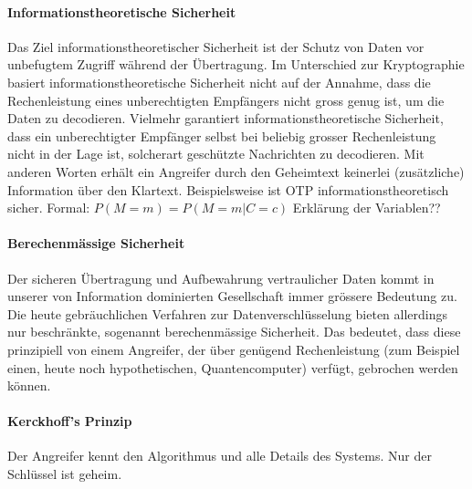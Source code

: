 \documentclass[10pt,a4paper]{article}
\begin{document}
\paragraph*{Informationstheoretische Sicherheit}Das Ziel informationstheoretischer Sicherheit ist der Schutz von Daten vor unbefugtem Zugriff während der Übertragung. Im Unterschied zur Kryptographie basiert informationstheoretische Sicherheit nicht auf der Annahme, dass die Rechenleistung eines unberechtigten Empfängers nicht gross genug ist, um die Daten zu decodieren. Vielmehr garantiert informationstheoretische Sicherheit, dass ein unberechtigter Empfänger selbst bei beliebig grosser Rechenleistung nicht in der Lage ist, solcherart geschützte Nachrichten zu decodieren. Mit anderen Worten erhält ein Angreifer durch den Geheimtext keinerlei (zusätzliche) Information über den Klartext.%
 Beispielsweise ist OTP informationstheoretisch sicher. \newline %
Formal:
\begin{math}
    P(M=m) = P(M=m|C=c)
\end{math} {\color{red}Erklärung der Variablen??}

\paragraph*{Berechenmässige Sicherheit}Der sicheren Übertragung und Aufbewahrung vertraulicher Daten kommt in unserer von Information dominierten Gesellschaft immer grössere Bedeutung zu. Die heute gebräuchlichen Verfahren zur Datenverschlüsselung bieten allerdings nur beschränkte, sogenannt berechenmässige Sicherheit. Das bedeutet, dass diese prinzipiell von einem Angreifer, der über genügend Rechenleistung (zum Beispiel einen, heute noch hypothetischen, Quantencomputer) verfügt, gebrochen werden können.

\paragraph*{Kerckhoff's Prinzip}Der Angreifer kennt den Algorithmus und alle Details des Systems. Nur der Schlüssel ist geheim.
\end{document}
